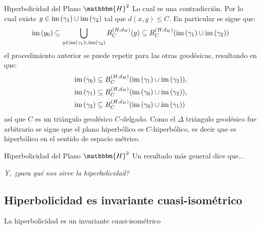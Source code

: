 \documentclass[xcolor=dvipsnames]{beamer}
\theoremstyle{largebreak}
\newcommand{\bbm}[1]{\ensuremath{\mathbbm{#1}}}
\newcommand{\im}[1]{\ensuremath{\textup{im}\left(#1\right)}}
\begin{document}
\begin{frame}{Hiperbolicidad del Plano $\bbm{H}^2$}
    Lo cual es una contradicción. Por lo cual existe $y\in\im{\gamma_1}\cup\im{\gamma_2}$ tal que $d(x,y)\leq C$. En particular se sigue que:
    \begin{equation*}
        \im{y_0}\subseteq \bigcup_{y\in\im{\gamma_1}\cup\im{\gamma_2}}B_C^{(H,d_H)}(y)\subseteq B_C^{(H,d_H)}( \im{\gamma_1}\cup\im{\gamma_2} )
    \end{equation*}
    el procedimiento anterior se puede repetir para las otras geodésicas, resultando en que:
    \begin{equation*}
        \begin{split}
            \im{\gamma_0}&\subseteq B_{C}^{(H,d_H)}(\im{\gamma_1}\cup\im{\gamma_2}),\\
            \im{\gamma_1}&\subseteq B_{C}^{(H,d_H)}(\im{\gamma_0}\cup\im{\gamma_2}),\\
            \im{\gamma_2}&\subseteq B_{C}^{(H,d_H)}(\im{\gamma_0}\cup\im{\gamma_1})\\
        \end{split}
    \end{equation*}
    así que $C$ es un triángulo geodésico $C$-delgado. Como el $\Delta$ triángulo geodésico fue arbitrario se sigue que el plano hiperbólico es $C$-hiperbólico, es decir que es hiperbólico en el sentido de espacio métrico.
\end{frame}

\begin{frame}{Hiperbolicidad del Plano $\bbm{H}^2$}
    Un resultado más general dice que... %
\end{frame}

\begin{frame}
    \begin{center}
        \textit{Y, ¿para qué nos sirve la hiperbolicidad?}
    \end{center}
\end{frame}

\subsection{Hiperbolicidad es invariante cuasi-isométrico}

\begin{frame}
    \begin{center}
        La hiperbolicidad es un invariante cuasi-isométrico
    \end{center}
\end{frame}
\end{document}

